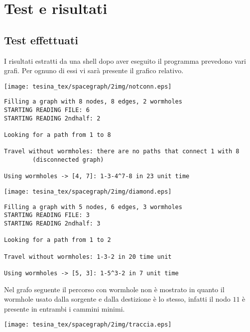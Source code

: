 \def\baselinestretch{1}
\section{Test e risultati}
\def\baselinestretch{1.66}
\thispagestyle{headings}

\subsection{Test effettuati}\label{notconn}
I risultati estratti da una shell dopo aver eseguito il programma prevedono vari grafi. Per ognuno
di essi vi sar\`a presente il grafico relativo.

\begin{center}
\texttt{[image: tesina\_tex/spacegraph/2img/notconn.eps]}
\end{center}

\begin{verbatim}
Filling a graph with 8 nodes, 8 edges, 2 wormholes
STARTING READING FILE: 6
STARTING READING 2ndhalf: 2

Looking for a path from 1 to 8

Travel without wormholes: there are no paths that connect 1 with 8
        (disconnected graph)

Using wormholes -> [4, 7]: 1-3-4^7-8 in 23 unit time
\end{verbatim}

\newpage

\begin{center}
\texttt{[image: tesina\_tex/spacegraph/2img/diamond.eps]}
\end{center}

\begin{verbatim}
Filling a graph with 5 nodes, 6 edges, 3 wormholes
STARTING READING FILE: 3
STARTING READING 2ndhalf: 3

Looking for a path from 1 to 2

Travel without wormholes: 1-3-2 in 20 time unit

Using wormholes -> [5, 3]: 1-5^3-2 in 7 unit time
\end{verbatim}



\newpage Nel grafo seguente il percorso con wormhole non \`e mostrato in quanto il wormhole
usato dalla sorgente e dalla destizione \`e lo stesso, infatti il nodo $11$ \`e presente
in entrambi i cammini minimi.
\begin{center}
\texttt{[image: tesina\_tex/spacegraph/2img/traccia.eps]}
\end{center}


